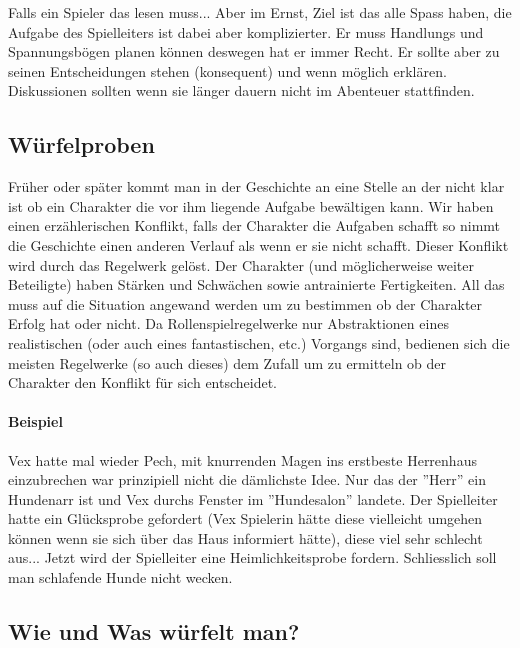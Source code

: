 \documentclass{article}
\begin{document}
Falls ein Spieler das lesen muss... Aber im Ernst, Ziel ist das alle Spass haben, die Aufgabe des Spielleiters ist
dabei aber komplizierter. Er muss Handlungs und Spannungsbögen planen können deswegen hat er immer Recht. Er sollte
aber zu seinen Entscheidungen stehen (konsequent) und wenn möglich erklären. Diskussionen sollten wenn sie länger
dauern nicht im Abenteuer stattfinden.

\begin{center}
\section{Würfelproben}
\end{center}

Früher oder später kommt man in der Geschichte an eine Stelle an der nicht klar ist ob ein Charakter die vor ihm
liegende Aufgabe bewältigen kann. Wir haben einen erzählerischen Konflikt, falls der Charakter die Aufgaben schafft
so nimmt die Geschichte einen anderen Verlauf als wenn er sie nicht schafft. Dieser Konflikt wird durch das Regelwerk
gelöst. Der Charakter (und möglicherweise weiter Beteiligte) haben Stärken und Schwächen sowie antrainierte
Fertigkeiten. All das muss auf die Situation angewand werden um zu bestimmen ob der Charakter Erfolg hat oder nicht.
Da Rollenspielregelwerke nur Abstraktionen eines realistischen (oder auch eines fantastischen, etc.) Vorgangs sind,
bedienen sich die meisten Regelwerke (so auch dieses) dem Zufall um zu ermitteln ob der Charakter den Konflikt für
sich entscheidet.

\paragraph{Beispiel}

Vex hatte mal wieder Pech, mit knurrenden Magen ins erstbeste Herrenhaus einzubrechen war prinzipiell nicht die
dämlichste Idee. Nur das der ''Herr'' ein Hundenarr ist und Vex durchs Fenster im ''Hundesalon'' landete.
Der Spielleiter hatte ein Glücksprobe gefordert (Vex Spielerin hätte diese vielleicht umgehen können wenn sie sich
über das Haus informiert hätte), diese viel sehr schlecht aus... Jetzt wird der Spielleiter eine Heimlichkeitsprobe
fordern. Schliesslich soll man schlafende Hunde nicht wecken.

\begin{center}
\subsection{Wie und Was würfelt man?}
\end{center}
\end{document}
